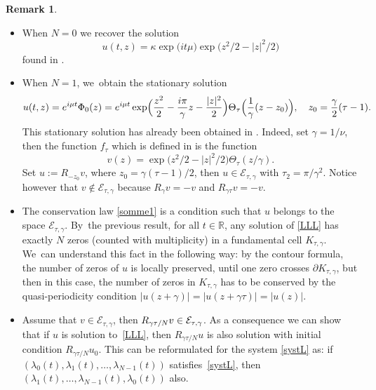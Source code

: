 \documentclass[10pt]{amsart}
\theoremstyle{definition}
\newtheorem{remark}[theorem]{Remark}
\let\EE\exp
\let\dis\relax
\newcommand\R{\mathbb R}
\newcommand\E{\mathcal E}
\providecommand{\skpt}{\par\smallskip\noindent}
\begin{document}
\skpt\begin{remark}\label{rem14}
\begin{itemize}
\item
When $N=0$ we recover the solution
\[
u(t,z) = \kappa \EE\bigl({it\mu}\bigr)\EE\bigl({z^2}/2 - {|z|^2}/2\bigr) 
\]
found in \cite[Prop.\,6.1]{GGT}.

\item
When $N=1$, we~obtain the stationary solution
\begin{equation*}
u(t,z)= e^{i\mu t}\Phi_0(z) =e^{i\mu t}\EE\Bigl({ \frac{z^2}2 -\frac{i\pi}{\gamma} z - \frac{|z|^2}2}\Bigr) \Theta_{\tau}\Bigl(\frac{1}{\gamma}(z-z_0)\Bigr), \quad z_0 = \frac{\gamma}{2}(\tau-1).
\end{equation*}
This stationary solution has already been obtained in \cite{ABN}. Indeed, set $\gamma=1/{\nu}$, then the function $f_\tau$ which is defined in \cite[Th.\,1.4]{ABN} is the function
\[
v(z)=\EE\bigl(z^2/2-|z|^2/2\bigr)\Theta_\tau({z}/{\gamma}).
\]
Set $u:=R_{-z_0}v$, where $z_0 = {\gamma}(\tau-1)/2$, then $u \in \mathcal{E}_{\tau,\gamma}$ with $\tau_2=\pi/\gamma^2$. Notice however that $v \notin \mathcal{E}_{\tau,\gamma}$ because $ R_\gamma v=-v$ and $ R_{\gamma \tau} v=-v$.

\item
The conservation law \eqref{somme1} is a condition such that $u$ belongs to the space $\E_{\tau,\gamma}$. By~the previous result, for all $t\in \R$, any solution of \eqref{LLL} has exactly $N$ zeros (counted with multiplicity) in a fundamental cell $K_{\tau,\gamma}$. We~can understand this fact in the following way: by the contour formula, the number of zeros of $u$ is locally preserved, until one zero crosses $\partial K_{\tau,\gamma}$, but then in this case, the number of zeros in $K_{\tau,\gamma}$ has to be conserved by the quasi-periodicity condition $\vert u(z+\gamma)\vert= \vert u(z+\gamma\tau)\vert=\vert u(z)\vert$.

\item
Assume that $v\in \E_{\tau,\gamma}$, then $\dis R_{{\gamma \tau}/N}v \in \E_{\tau,\gamma}$. As a consequence we can show that if $u$ is solution to~\eqref{LLL}, then $R_{{\gamma \tau}/N}u$ is also solution with initial condition $R_{{\gamma \tau}/N}u_0$. This can be reformulated for the system \eqref{systL} as: if $(\lambda_0(t),\lambda_1(t), \dots, \lambda_{N-1}(t))$ satisfies~\eqref{systL}, then $(\lambda_1(t), \dots, \lambda_{N-1}(t),\lambda_{0}(t))$ also.
\end{itemize}
\end{remark}
\end{document}
